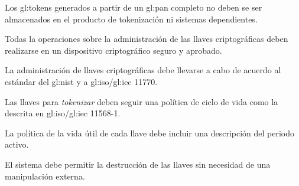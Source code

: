 {
  Los \glspl{gl:token} generados a partir de un \gls{gl:pan} completo no
  deben se ser almacenados en el producto de tokenización ni sistemas
  dependientes.
}



{
  Todas la operaciones sobre la administración de las llaves criptográficas
  deben realizarse en un dispositivo criptográfico seguro y aprobado.
}


{
  La administración de llaves criptográficas debe llevarse a cabo de
  acuerdo al estándar del \gls{gl:nist} \cite{nist_llaves} y a
  \acrshort{gl:iso}/\acrshort{gl:iec} 11770.

  {
    Las llaves para \textit{tokenizar} deben seguir una política de
    ciclo de vida como la descrita en  \acrshort{gl:iso}/\acrshort{gl:iec}
    11568-1.
  }

  {
    La política de la vida útil de cada llave debe incluir una
    descripción del periodo activo.
  }

  {
    El sistema debe permitir la destrucción de las llaves sin necesidad
    de una manipulación externa.
  }
}

